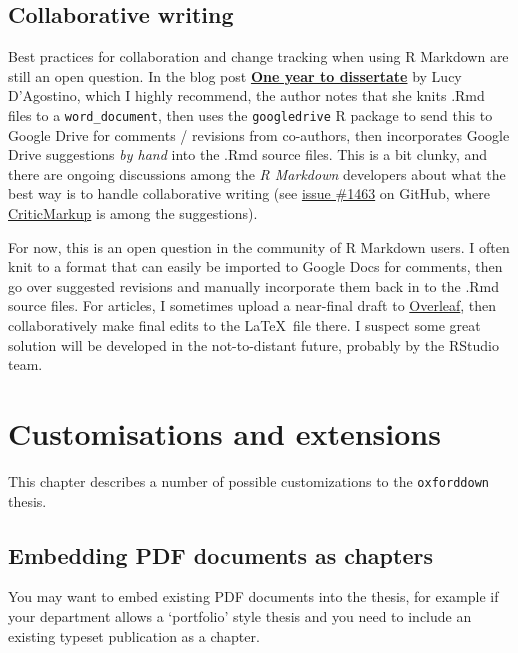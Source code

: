 \documentclass[a4paper, twoside]{templates/ociamthesis}
\begin{document}
\hypertarget{collaborative-writing}{%
\section{Collaborative writing}\label{collaborative-writing}}

Best practices for collaboration and change tracking when using R Markdown are still an open question.
In the blog post \href{https://livefreeordichotomize.com/2018/09/14/one-year-to-dissertate/}{\textbf{One year to dissertate}} by Lucy D'Agostino, which I highly recommend, the author notes that she knits .Rmd files to a \texttt{word\_document}, then uses the \texttt{googledrive} R package to send this to Google Drive for comments / revisions from co-authors, then incorporates Google Drive suggestions \emph{by hand} into the .Rmd source files.
This is a bit clunky, and there are ongoing discussions among the \emph{R Markdown} developers about what the best way is to handle collaborative writing (see \href{https://github.com/rstudio/rmarkdown/issues/1463}{issue \#1463} on GitHub, where \href{http://criticmarkup.com}{CriticMarkup} is among the suggestions).

For now, this is an open question in the community of R Markdown users.
I often knit to a format that can easily be imported to Google Docs for comments, then go over suggested revisions and manually incorporate them back in to the .Rmd source files.
For articles, I sometimes upload a near-final draft to \href{https://www.overleaf.com/}{Overleaf}, then collaboratively make final edits to the \LaTeX~file there.
I suspect some great solution will be developed in the not-to-distant future, probably by the RStudio team.

\hypertarget{customisations-and-extensions}{%
\chapter{Customisations and extensions}\label{customisations-and-extensions}}

This chapter describes a number of possible customizations to the \texttt{oxforddown} thesis.

\hypertarget{embedding-pdf-documents-as-chapters}{%
\section{Embedding PDF documents as chapters}\label{embedding-pdf-documents-as-chapters}}

You may want to embed existing PDF documents into the thesis, for example if your department allows a `portfolio' style thesis and you need to include an existing typeset publication as a chapter.
\end{document}
